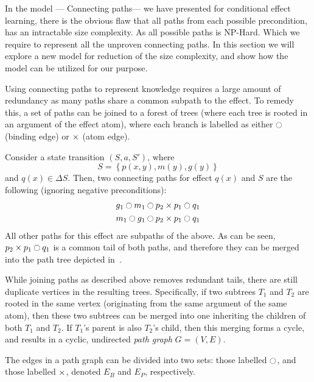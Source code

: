 \documentclass[\master/Master.tex]{subfiles}
\begin{document}
In the model --- Connecting paths--- we have presented for conditional effect learning, there is the obvious flaw that all paths from each possible precondition, has an intractable size complexity. 
As all possible paths is NP-Hard. Which we require to represent all  the unproven connecting paths. 
In this section we will explore a new model for reduction of the size complexity, and show how the model can be utilized for our purpose. 

Using connecting paths to represent knowledge requires a large amount of redundancy as many paths share a common subpath to the effect. To remedy this, a set of paths can be joined to a forest of trees (where each tree is rooted in an argument of the effect atom), where each branch is labelled as either $\ocircle$ (binding edge) or $\times$ (atom edge).

\begin{example}\label{ex:ca:pathTrees}
    Consider a state transition $\left( S, a, S' \right)$, where 
    \begin{equation*}
        S = \left\{ p(x, y), m(y), g(y) \right\}
    \end{equation*}
    and $q(x) \in \Delta S$. Then, two connecting paths for effect $q(x)$ and $S$ are the following (ignoring negative preconditions):
    \begin{align*}
        & g_1 \ocircle m_1 \ocircle p_2 \times p_1 \ocircle q_1 \\
        & m_1 \ocircle g_1 \ocircle p_2 \times p_1 \ocircle q_1
    \end{align*}
    All other paths for this effect are subpaths of the above. As can be seen, $p_2 \times p_1 \ocircle q_1$ is a common tail of both paths, and therefore they can be merged into the path tree depicted in~.
\end{example}

While joining paths as described above removes redundant tails, there are still duplicate vertices in the resulting trees. Specifically, if two subtrees $T_1$ and $T_2$ are rooted in the same vertex (originating from the same argument of the same atom), then these two subtrees can be merged into one inheriting the children of both $T_1$ and $T_2$. If $T_1$'s parent is also $T_2$'s child, then this merging forms a cycle, and results in a cyclic, undirected \emph{path graph} $G = (V, E)$. 

The edges in a path graph can be divided into two sets: those labelled $\ocircle$, and those labelled $\times$, denoted $E_B$ and $E_P$, respectively.
\end{document}
